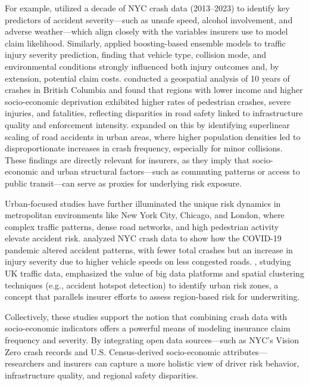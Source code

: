 \documentclass[
  number,
  review,
  3p]{elsarticle}
\begin{document}
For example, \citet{adeniyi} utilized a decade of NYC crash data
(2013--2023) to identify key predictors of accident severity---such as
unsafe speed, alcohol involvement, and adverse weather---which align
closely with the variables insurers use to model claim likelihood.
Similarly, \citet{dong} applied boosting-based ensemble models to
traffic injury severity prediction, finding that vehicle type, collision
mode, and environmental conditions strongly influenced both injury
outcomes and, by extension, potential claim costs. \citet{brubacher}
conducted a geospatial analysis of 10 years of crashes in British
Columbia and found that regions with lower income and higher
socio-economic deprivation exhibited higher rates of pedestrian crashes,
severe injuries, and fatalities, reflecting disparities in road safety
linked to infrastructure quality and enforcement intensity.
\citet{cabrera} expanded on this by identifying superlinear scaling of
road accidents in urban areas, where higher population densities led to
disproportionate increases in crash frequency, especially for minor
collisions. These findings are directly relevant for insurers, as they
imply that socio-economic and urban structural factors---such as
commuting patterns or access to public transit---can serve as proxies
for underlying risk exposure.

Urban-focused studies have further illuminated the unique risk dynamics
in metropolitan environments like New York City, Chicago, and London,
where complex traffic patterns, dense road networks, and high pedestrian
activity elevate accident risk. \citet{adeniyi} analyzed NYC crash data
to show how the COVID-19 pandemic altered accident patterns, with fewer
total crashes but an increase in injury severity due to higher vehicle
speeds on less congested roads. \citet{feng}, studying UK traffic data,
emphasized the value of big data platforms and spatial clustering
techniques (e.g., accident hotspot detection) to identify urban risk
zones, a concept that parallels insurer efforts to assess region-based
risk for underwriting.

Collectively, these studies support the notion that combining crash data
with socio-economic indicators offers a powerful means of modeling
insurance claim frequency and severity. By integrating open data
sources---such as NYC's Vision Zero crash records and U.S.
Census-derived socio-economic attributes---researchers and insurers can
capture a more holistic view of driver risk behavior, infrastructure
quality, and regional safety disparities.
\end{document}
